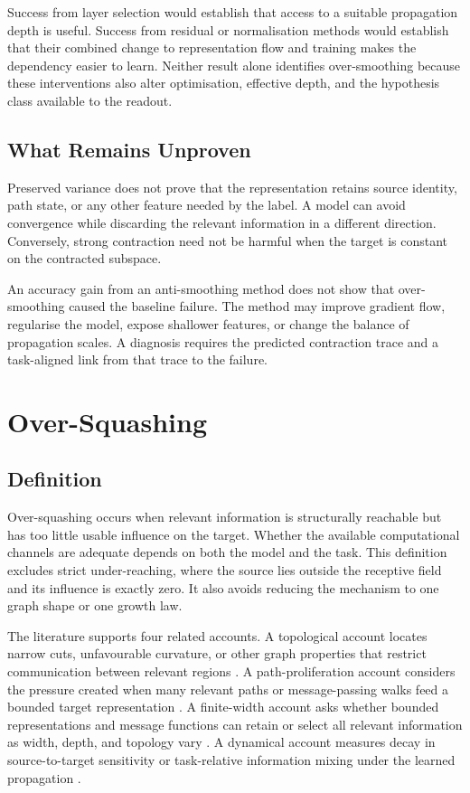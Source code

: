 Success from layer selection would establish that access to a suitable propagation depth is useful.
Success from residual or normalisation methods would establish that their combined change to representation flow and training makes the dependency easier to learn.
Neither result alone identifies over-smoothing because these interventions also alter optimisation, effective depth, and the hypothesis class available to the readout.

\subsection{What Remains Unproven}

Preserved variance does not prove that the representation retains source identity, path state, or any other feature needed by the label.
A model can avoid convergence while discarding the relevant information in a different direction.
Conversely, strong contraction need not be harmful when the target is constant on the contracted subspace.

An accuracy gain from an anti-smoothing method does not show that over-smoothing caused the baseline failure.
The method may improve gradient flow, regularise the model, expose shallower features, or change the balance of propagation scales.
A diagnosis requires the predicted contraction trace and a task-aligned link from that trace to the failure.

\section{Over-Squashing}

\subsection{Definition}

Over-squashing occurs when relevant information is structurally reachable but has too little usable influence on the target.
Whether the available computational channels are adequate depends on both the model and the task.
This definition excludes strict under-reaching, where the source lies outside the receptive field and its influence is exactly zero.
It also avoids reducing the mechanism to one graph shape or one growth law.

The literature supports four related accounts.
A topological account locates narrow cuts, unfavourable curvature, or other graph properties that restrict communication between relevant regions \cite{topping2022curvature}.
A path-proliferation account considers the pressure created when many relevant paths or message-passing walks feed a bounded target representation \cite{alon2021bottleneck}.
A finite-width account asks whether bounded representations and message functions can retain or select all relevant information as width, depth, and topology vary \cite{digionvanni2023oversquashing}.
A dynamical account measures decay in source-to-target sensitivity or task-relative information mixing under the learned propagation \cite{digionvanni2024power,bamberger2025measuring}.


